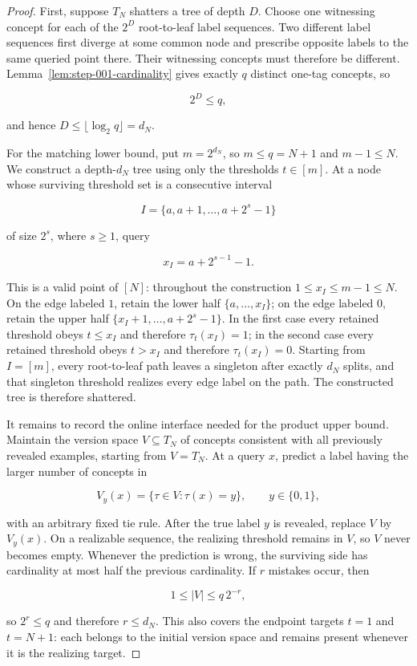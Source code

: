 \begin{proof}
First, suppose \(T_N\) shatters a tree of depth \(D\). Choose one witnessing concept for each of the \(2^D\) root-to-leaf label sequences. Two different label sequences first diverge at some common node and prescribe opposite labels to the same queried point there. Their witnessing concepts must therefore be different. Lemma~\ref{lem:step-001-cardinality} gives exactly \(q\) distinct one-tag concepts, so

\[
2^D\le q,
\]

and hence \(D\le\lfloor\log_2q\rfloor=d_N\).

For the matching lower bound, put \(m=2^{d_N}\), so \(m\le q=N+1\) and \(m-1\le N\). We construct a depth-\(d_N\) tree using only the thresholds \(t\in[m]\). At a node whose surviving threshold set is a consecutive interval

\[
I=\{a,a+1,\ldots,a+2^s-1\}
\]

of size \(2^s\), where \(s\ge1\), query

\[
x_I=a+2^{s-1}-1.
\]

This is a valid point of \([N]\): throughout the construction \(1\le x_I\le m-1\le N\). On the edge labeled \(1\), retain the lower half \(\{a,\ldots,x_I\}\); on the edge labeled \(0\), retain the upper half \(\{x_I+1,\ldots,a+2^s-1\}\). In the first case every retained threshold obeys \(t\le x_I\) and therefore \(\tau_t(x_I)=1\); in the second case every retained threshold obeys \(t>x_I\) and therefore \(\tau_t(x_I)=0\). Starting from \(I=[m]\), every root-to-leaf path leaves a singleton after exactly \(d_N\) splits, and that singleton threshold realizes every edge label on the path. The constructed tree is therefore shattered.

It remains to record the online interface needed for the product upper bound. Maintain the version space \(V\subseteq T_N\) of concepts consistent with all previously revealed examples, starting from \(V=T_N\). At a query \(x\), predict a label having the larger number of concepts in

\[
V_y(x)=\{\tau\in V:\tau(x)=y\},\qquad y\in\{0,1\},
\]

with an arbitrary fixed tie rule. After the true label \(y\) is revealed, replace \(V\) by \(V_y(x)\). On a realizable sequence, the realizing threshold remains in \(V\), so \(V\) never becomes empty. Whenever the prediction is wrong, the surviving side has cardinality at most half the previous cardinality. If \(r\) mistakes occur, then

\[
1\le \lvert V\rvert\le q\,2^{-r},
\]

so \(2^r\le q\) and therefore \(r\le d_N\). This also covers the endpoint targets \(t=1\) and \(t=N+1\): each belongs to the initial version space and remains present whenever it is the realizing target. \end{proof}

